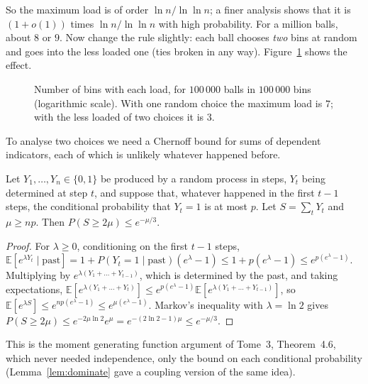 So the maximum load is of order $\ln n/\ln\ln n$; a finer analysis shows that it is $(1+o(1))$ times $\ln n/\ln\ln n$ with high probability. For a million balls, about $8$ or $9$. Now change the rule slightly: each ball chooses \emph{two} bins at random and goes into the
less loaded one (ties broken in any way). Figure~\ref{fig:loads} shows the effect.

\begin{figure}[ht]
\centering
{}
\caption{Number of bins with each load, for $100\,000$ balls in $100\,000$ bins (logarithmic scale). With one random choice the maximum load is $7$; with the less loaded of two choices it is $3$.}
\label{fig:loads}
\end{figure}

To analyse two choices we need a Chernoff bound for sums of dependent indicators, each of which is unlikely whatever happened before.

\begin{lemma}\label{lem:chernoffdom}
Let $Y_1,\dots,Y_n\in\{0,1\}$ be produced by a random process in steps, $Y_t$ being determined at step $t$, and suppose that, whatever happened in the first $t-1$ steps, the conditional probability that $Y_t=1$ is at most $p$. Let $S=\sum_tY_t$ and $\mu\ge np$. Then
$P(S\ge2\mu)\le e^{-\mu/3}$.
\end{lemma}
\begin{proof}
For $\lambda\ge0$, conditioning on the first $t-1$ steps, $\mathbb E[e^{\lambda Y_t}\mid\text{past}]=1+P(Y_t=1\mid\text{past})(e^\lambda-1)\le1+p(e^\lambda-1)\le e^{p(e^\lambda-1)}$. Multiplying by $e^{\lambda(Y_1+\dots+Y_{t-1})}$, which is determined by the past, and taking expectations,
$\mathbb E[e^{\lambda(Y_1+\dots+Y_t)}]\le e^{p(e^\lambda-1)}\mathbb E[e^{\lambda(Y_1+\dots+Y_{t-1})}]$, so $\mathbb E[e^{\lambda S}]\le e^{np(e^\lambda-1)}\le e^{\mu(e^\lambda-1)}$. Markov's inequality with $\lambda=\ln2$ gives $P(S\ge2\mu)\le e^{-2\mu\ln2}e^{\mu}=e^{-(2\ln2-1)\mu}\le e^{-\mu/3}$.
\end{proof}

This is the moment generating function argument of Tome~3, Theorem~4.6, which never needed independence, only the bound on each conditional probability (Lemma~\ref{lem:dominate} gave a coupling version of the same idea).

